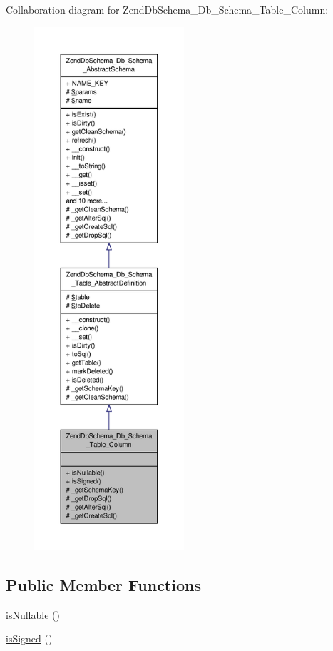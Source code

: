 Collaboration diagram for Zend\-Db\-Schema\-\_\-\-Db\-\_\-\-Schema\-\_\-\-Table\-\_\-\-Column\-:\nopagebreak
\begin{figure}[H]
\begin{center}
\leavevmode
\includegraphics[height=550pt]{classZendDbSchema__Db__Schema__Table__Column__coll__graph}
\end{center}
\end{figure}
\subsection*{Public Member Functions}
\begin{DoxyCompactItemize}
\item 
\hyperlink{classZendDbSchema__Db__Schema__Table__Column_aeeed5820cfc4fac67507a196e9faa638}{is\-Nullable} ()
\item 
\hyperlink{classZendDbSchema__Db__Schema__Table__Column_a49887d783c47fa509e229ca61dd113ef}{is\-Signed} ()
\end{DoxyCompactItemize}
